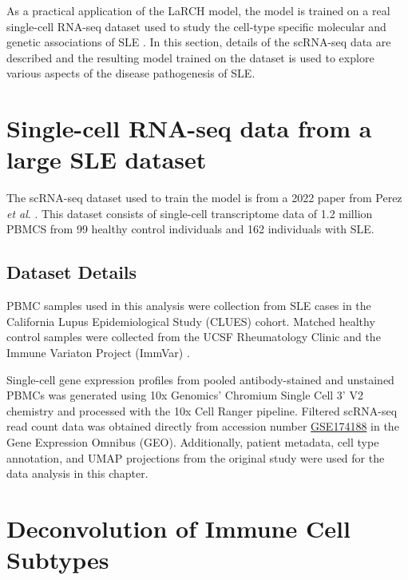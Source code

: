 \label{cha:sle}
As a practical application of the LaRCH model, the model is trained on a real single-cell RNA-seq dataset used to study the cell-type specific molecular and genetic associations of SLE \cite{sledata}. In this section, details of the scRNA-seq data are described and the resulting model trained on the dataset is used to explore various aspects of the disease pathogenesis of SLE.

\section{Single-cell RNA-seq data from a large SLE dataset}

The scRNA-seq dataset used to train the model is from a 2022 paper from Perez \textit{et al}. \cite{sledata}. This dataset consists of single-cell transcriptome data of 1.2 million PBMCS from 99 healthy control individuals and 162 individuals with SLE. 

\subsection{Dataset Details}

PBMC samples used in this analysis were collection from SLE cases in the California Lupus Epidemiological Study (CLUES) cohort. Matched healthy control samples were collected from the UCSF Rheumatology Clinic and the Immune Variaton Project (ImmVar) \cite{sledata}.

Single-cell gene expression profiles from pooled antibody-stained and unstained PBMCs was generated using 10x Genomics' Chromium Single Cell 3' V2 chemistry and processed with the 10x Cell Ranger pipeline. Filtered scRNA-seq read count data was obtained directly from accession number \href{https://www.ncbi.nlm.nih.gov/geo/query/acc.cgi}{GSE174188} in the Gene Expression Omnibus (GEO). Additionally, patient metadata, cell type annotation, and UMAP projections from the original study were used for the data analysis in this chapter.

\newpage 
\section{Deconvolution of Immune Cell Subtypes}

